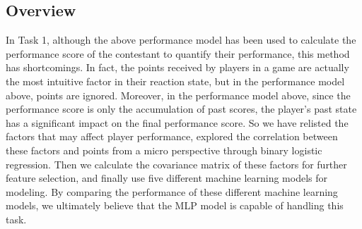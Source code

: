 \documentclass{mcmthesis}
\begin{document}
\subsection{Overview}
In Task 1, although the above performance model has been used to calculate the performance score of the contestant to quantify their performance, this method has shortcomings. In fact, the points received by players in a game are actually the most intuitive factor in their reaction state, but in the performance model above, points are ignored. Moreover, in the performance model above, since the performance score is only the accumulation of past scores, the player's past state has a significant impact on the final performance score. So we have relisted the factors that may affect player performance, explored the correlation between these factors and points from a micro perspective through binary logistic regression. Then we calculate the covariance matrix of these factors for further feature selection, and finally use five different machine learning models for modeling. By comparing the performance of these different machine learning models, we ultimately believe that the MLP model is capable of handling this task.
\end{document}
